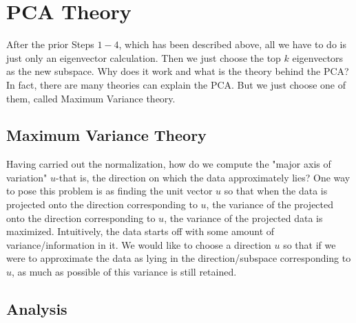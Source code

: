 \documentclass[a4paper]{article}
\begin{document}
\section{PCA Theory}

After the prior Steps $1-4$, which has been described above, all we have to do is just only an eigenvector calculation. Then we just choose the top $k$ eigenvectors as the new subspace. Why does it work and what is the theory behind the PCA? In fact, there are many theories can explain the PCA. But we just choose one of them, called Maximum Variance theory.

\subsection{Maximum Variance Theory}

Having carried out the normalization, how do we compute the "major axis of variation" $u$-that is, the direction on which the data approximately lies? One way to pose this problem is as finding the unit vector $u$ so that when the data is projected onto the direction corresponding to $u$, the variance of the projected onto the direction corresponding to $u$, the variance of the projected data is maximized. Intuitively, the data starts off with some amount of variance/information in it. We would like to choose a direction $u$ so that if we were to approximate the data as lying in the direction/subspace corresponding to $u$, as much as possible of this variance is still retained.

\subsection{Analysis}
\end{document}

